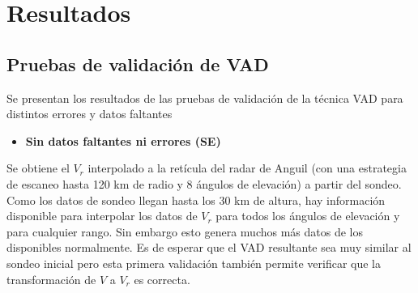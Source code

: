 \documentclass[12pt,spanish,oneside, a4paper]{book}
\providecommand{\tightlist}{%
  \setlength{\itemsep}{0pt}\setlength{\parskip}{0pt}}
\begin{document}
\chapter{Resultados}\label{resultados}

\section{\texorpdfstring{Pruebas de validación de VAD
\label{sec-validacion}}{Pruebas de validación de VAD }}\label{pruebas-de-validacion-de-vad}

Se presentan los resultados de las pruebas de validación de la técnica
VAD para distintos errores y datos faltantes

\begin{itemize}
\tightlist
\item
  \textbf{Sin datos faltantes ni errores (SE)}
\end{itemize}

Se obtiene el \(V_r\) interpolado a la retícula del radar de Anguil (con
una estrategia de escaneo hasta 120 km de radio y 8 ángulos de
elevación) a partir del sondeo. Como los datos de sondeo llegan hasta
los 30 km de altura, hay información disponible para interpolar los
datos de \(V_r\) para todos los ángulos de elevación y para cualquier
rango. Sin embargo esto genera muchos más datos de los disponibles
normalmente. Es de esperar que el VAD resultante sea muy similar al
sondeo inicial pero esta primera validación también permite verificar
que la transformación de \(V\) a \(V_r\) es correcta.
\end{document}
